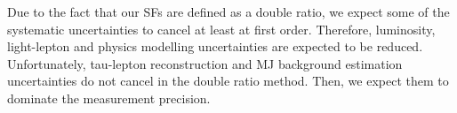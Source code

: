 Due to the fact that our SFs are defined as a double ratio, we expect some of the systematic uncertainties to cancel at least at first order. Therefore, luminosity, light-lepton and physics modelling uncertainties are expected to be reduced. Unfortunately, tau-lepton reconstruction and MJ background estimation uncertainties do not cancel in the double ratio method. Then, we expect them to dominate the measurement precision.

